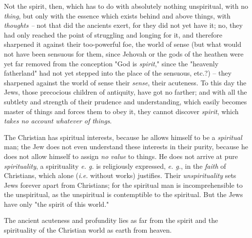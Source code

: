 \documentclass[a4paper]{book}
\begin{document}
Not the spirit, then, which has to do with absolutely nothing unspiritual, 
with no \textit{thing}, but only with the essence which exists behind and 
above things, with \textit{thoughts --} not that did the ancients exert, for 
they did not yet have it; no, they had only reached the point of struggling 
and longing for it, and therefore sharpened it against their too-powerful foe, 
the world of sense (but what would not have been sensuous for them, since 
Jehovah or the gods of the heathen were yet far removed from the conception 
"{}God is \textit{spirit},"{} since the "{}heavenly fatherland"{} had not yet 
stepped into the place of the sensuous, etc.?) -- they sharpened against the 
world of sense their \textit{sense}, their acuteness. To this day the Jews, 
those precocious children of antiquity, have got no farther; and with all the 
subtlety and strength of their prudence and understanding, which easily 
becomes master of things and forces them to obey it, they cannot discover 
\textit{spirit}, which \textit{takes no account whatever of things}.

The Christian has spiritual interests, because he allows himself to be a 
\textit{spiritual} man; the Jew does not even understand these interests in 
their purity, because he does not allow himself to assign \textit{no value} to 
things. He does not arrive at pure \textit{spirituality}, a spirituality 
\textit{e. g.} is religiously expressed, \textit{e. g.}, in the \textit{faith} 
of Christians, which alone (\textit{i.e.} without works) justifies. Their 
\textit{unspirituality} sets Jews forever apart from Christians; for the 
spiritual man is incomprehensible to the unspiritual, as the unspiritual is 
contemptible to the spiritual. But the Jews have only "{}the spirit of this 
world."{}

The ancient acuteness and profundity lies as far from the spirit and the 
spirituality of the Christian world as earth from heaven.
\end{document}
